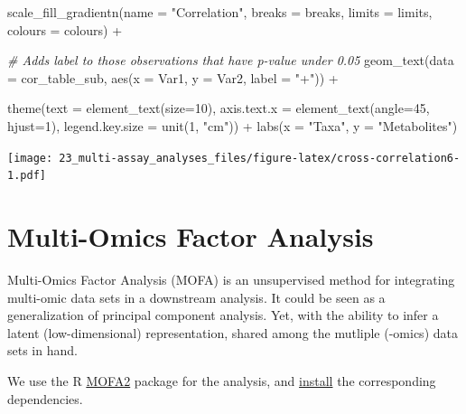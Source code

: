 \documentclass[
]{book}
\newenvironment{Shaded}{\begin{snugshade}}{\end{snugshade}}
\newcommand{\AttributeTok}[1]{\textcolor[rgb]{0.77,0.63,0.00}{#1}}
\newcommand{\CommentTok}[1]{\textcolor[rgb]{0.56,0.35,0.01}{\textit{#1}}}
\newcommand{\DecValTok}[1]{\textcolor[rgb]{0.00,0.00,0.81}{#1}}
\newcommand{\FunctionTok}[1]{\textcolor[rgb]{0.00,0.00,0.00}{#1}}
\newcommand{\NormalTok}[1]{#1}
\newcommand{\SpecialCharTok}[1]{\textcolor[rgb]{0.00,0.00,0.00}{#1}}
\newcommand{\StringTok}[1]{\textcolor[rgb]{0.31,0.60,0.02}{#1}}
\begin{document}
\begin{Shaded}
\begin{Highlighting}[]
  \FunctionTok{scale\_fill\_gradientn}\NormalTok{(}\AttributeTok{name =} \StringTok{"Correlation"}\NormalTok{,}
                       \AttributeTok{breaks =}\NormalTok{ breaks, }\AttributeTok{limits =}\NormalTok{ limits, }\AttributeTok{colours =}\NormalTok{ colours) }\SpecialCharTok{+}

  \CommentTok{\# Adds label to those observations that have p{-}value under 0.05}
  \FunctionTok{geom\_text}\NormalTok{(}\AttributeTok{data =}\NormalTok{ cor\_table\_sub, }\FunctionTok{aes}\NormalTok{(}\AttributeTok{x =}\NormalTok{ Var1, }\AttributeTok{y =}\NormalTok{ Var2, }\AttributeTok{label =} \StringTok{"+"}\NormalTok{)) }\SpecialCharTok{+}

  \FunctionTok{theme}\NormalTok{(}\AttributeTok{text =} \FunctionTok{element\_text}\NormalTok{(}\AttributeTok{size=}\DecValTok{10}\NormalTok{),}
        \AttributeTok{axis.text.x =} \FunctionTok{element\_text}\NormalTok{(}\AttributeTok{angle=}\DecValTok{45}\NormalTok{, }\AttributeTok{hjust=}\DecValTok{1}\NormalTok{),}
        \AttributeTok{legend.key.size =} \FunctionTok{unit}\NormalTok{(}\DecValTok{1}\NormalTok{, }\StringTok{"cm"}\NormalTok{)) }\SpecialCharTok{+}
  \FunctionTok{labs}\NormalTok{(}\AttributeTok{x =} \StringTok{"Taxa"}\NormalTok{, }\AttributeTok{y =} \StringTok{"Metabolites"}\NormalTok{)}
\end{Highlighting}
\end{Shaded}

\texttt{[image: 23\_multi-assay\_analyses\_files/figure-latex/cross-correlation6-1.pdf]}

\hypertarget{multi-omics-factor-analysis}{%
\section{Multi-Omics Factor Analysis}\label{multi-omics-factor-analysis}}

Multi-Omics Factor Analysis \citep{Argelaguet2018} (MOFA) is
an unsupervised method for integrating multi-omic data sets in a downstream analysis.
It could be seen as a generalization of principal component analysis. Yet, with the ability to infer a latent (low-dimensional) representation,
shared among the mutliple (-omics) data sets in hand.

We use the R \href{https://biofam.github.io/MOFA2/index.html}{MOFA2} package
for the analysis, and \href{https://biofam.github.io/MOFA2/installation.html}{install} the corresponding dependencies.
\end{document}
